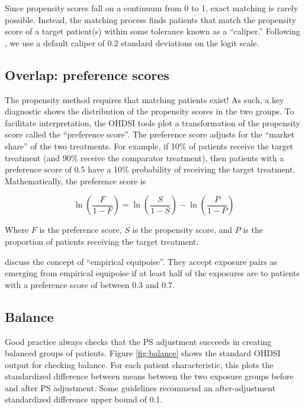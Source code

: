 \documentclass[11pt]{book}
\theoremstyle{definition}
\theoremstyle{definition}
\theoremstyle{definition}
\theoremstyle{remark}
\begin{document}

Since propensity scores fall on a continuum from 0 to 1, exact matching is rarely possible. Instead, the matching process finds patients that match the propensity score of a target patient(s) within some tolerance known as a ``caliper.'' Following \citet{austin_2011}, we use a default caliper of 0.2 standard deviations on the logit scale.

\hypertarget{overlap-preference-scores}{%
\subsection{Overlap: preference scores}\label{overlap-preference-scores}}


The propensity method requires that matching patients exist! As such, a key diagnostic shows the distribution of the propensity scores in the two groups. To facilitate interpretation, the OHDSI tools plot a transformation of the propensity score called the ``preference score''. \citep{walker_2013} The preference score adjusts for the ``market share'' of the two treatments. For example, if 10\% of patients receive the target treatment (and 90\% receive the comparator treatment), then patients with a preference score of 0.5 have a 10\% probability of receiving the target treatment. Mathematically, the preference score is

\[\ln\left(\frac{F}{1-F}\right)=\ln\left(\frac{S}{1-S}\right)-\ln\left(\frac{P}{1-P}\right)\]

Where \(F\) is the preference score, \(S\) is the propensity score, and \(P\) is the proportion of patients receiving the target treatment.

\citet{walker_2013} discuss the concept of ``empirical equipoise''. They accept exposure pairs as emerging from empirical equipoise if at least half of the exposures are to patients with a preference score of between 0.3 and 0.7.

\hypertarget{balance}{%
\subsection{Balance}\label{balance}}

Good practice always checks that the PS adjustment succeeds in creating balanced groups of patients. Figure \ref{fig:balance} shows the standard OHDSI output for checking balance. For each patient characteristic, this plots the standardized difference between means between the two exposure groups before and after PS adjustment. Some guidelines recommend an after-adjustment standardized difference upper bound of 0.1. \citep{rubin_2001}
\end{document}
